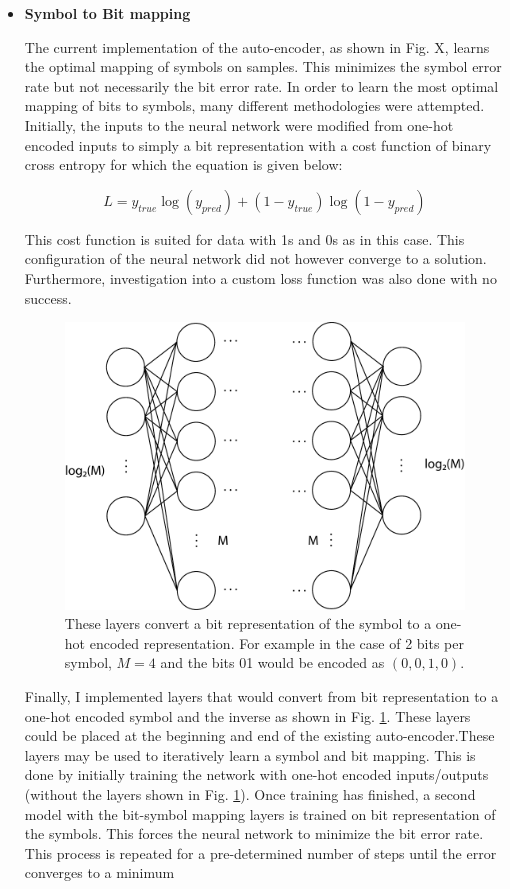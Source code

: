 \begin{itemize}
    \item \textbf{Symbol to Bit mapping}
    
        The current implementation of the auto-encoder, as shown in Fig. X, learns the optimal mapping of symbols on samples. This minimizes the symbol error rate but not necessarily the bit error rate. In order to learn the most optimal mapping of bits to symbols, many different methodologies were attempted. Initially, the inputs to the neural network were modified from one-hot encoded inputs to simply a bit representation with a cost function of binary cross entropy for which the equation is given below:
        
        \begin{equation}
            L=y_{true}\log\left(y_{pred}\right) + (1-y_{true})\log\left(1-y_{pred}\right)
        \end{equation}
        
        This cost function is suited for data with 1s and 0s as in this case. This configuration of the neural network did not however converge to a solution. Furthermore, investigation into a custom loss function was also done with no success.
        
        \begin{figure}[H]
            \centering
            \includegraphics[width=0.75\linewidth]{resources/symbol_mapping.pdf}
            \caption{These layers convert a bit representation of the symbol to a one-hot encoded representation. For example in the case of 2 bits per symbol, $M=4$ and the bits 01 would be encoded as $(0,0,1,0)$.}
            \label{fig:symbol_mapping}
        \end{figure}
        
        Finally, I implemented layers that would convert from bit representation to a one-hot encoded symbol and the inverse as shown in Fig. \ref{fig:symbol_mapping}. These layers could be placed at the beginning and end of the existing auto-encoder.These layers may be used to iteratively learn a symbol and bit mapping. This is done by initially training the network with one-hot encoded inputs/outputs (without the layers shown in Fig. \ref{fig:symbol_mapping}). Once training has finished, a second model with the bit-symbol mapping layers is trained on bit representation of the symbols. This forces the neural network to minimize the bit error rate. This process is repeated for a pre-determined number of steps until the error converges to a minimum
    
\end{itemize}

